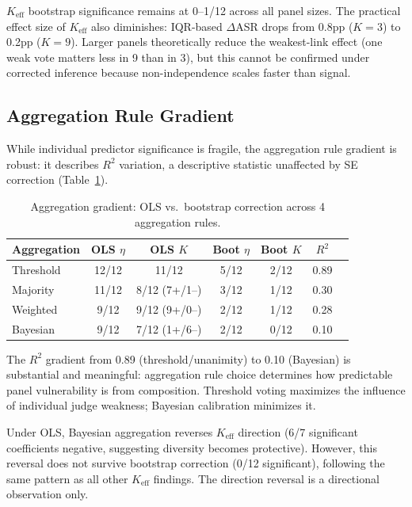 \documentclass[11pt]{article}
\begin{document}
$K_{\text{eff}}$ bootstrap significance remains at 0--1/12 across all panel sizes. The practical effect size of $K_{\text{eff}}$ also diminishes: IQR-based $\Delta$ASR drops from 0.8pp ($K{=}3$) to 0.2pp ($K{=}9$). Larger panels theoretically reduce the weakest-link effect (one weak vote matters less in 9 than in 3), but this cannot be confirmed under corrected inference because non-independence scales faster than signal.

\subsection{Aggregation Rule Gradient}
\label{sec:aggregation}

While individual predictor significance is fragile, the aggregation rule gradient is robust: it describes $R^2$ variation, a descriptive statistic unaffected by SE correction (Table~\ref{tab:aggregation}).

\begin{table}[h]
\centering
\caption{Aggregation gradient: OLS vs.\ bootstrap correction across 4 aggregation rules.}
\label{tab:aggregation}
\small
\begin{tabular}{lcccccc}
\toprule
Aggregation & OLS $\eta$ & OLS $K$ & Boot $\eta$ & Boot $K$ & $R^2$ \\
\midrule
Threshold & 12/12 & 11/12 & 5/12 & 2/12 & 0.89 \\
Majority & 11/12 & 8/12 (7+/1--) & 3/12 & 1/12 & 0.30 \\
Weighted & 9/12 & 9/12 (9+/0--) & 2/12 & 1/12 & 0.28 \\
Bayesian & 9/12 & 7/12 (1+/6--) & 2/12 & 0/12 & 0.10 \\
\bottomrule
\end{tabular}
\end{table}

The $R^2$ gradient from 0.89 (threshold/unanimity) to 0.10 (Bayesian) is substantial and meaningful: aggregation rule choice determines how predictable panel vulnerability is from composition. Threshold voting maximizes the influence of individual judge weakness; Bayesian calibration minimizes it.

Under OLS, Bayesian aggregation reverses $K_{\text{eff}}$ direction (6/7 significant coefficients negative, suggesting diversity becomes protective). However, this reversal does not survive bootstrap correction (0/12 significant), following the same pattern as all other $K_{\text{eff}}$ findings. The direction reversal is a directional observation only.
\end{document}
